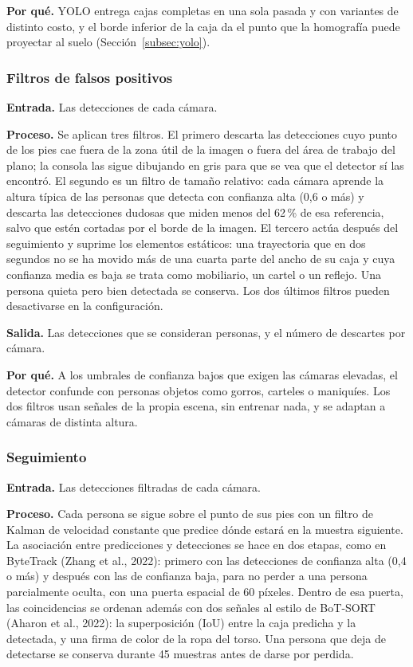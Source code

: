 \textbf{Por qué.} YOLO entrega cajas completas en una sola pasada y con variantes de distinto
costo, y el borde inferior de la caja da el punto que la homografía puede proyectar al suelo
(Sección~\ref{subsec:yolo}).

\subsubsection{Filtros de falsos positivos}
\label{subsec:met-filtros}

\textbf{Entrada.} Las detecciones de cada cámara.

\textbf{Proceso.} Se aplican tres filtros. El primero descarta las detecciones cuyo punto de los
pies cae fuera de la zona útil de la imagen o fuera del área de trabajo del plano; la consola las
sigue dibujando en gris para que se vea que el detector sí las encontró. El segundo es un filtro
de tamaño relativo: cada cámara aprende la altura típica de las personas que detecta con
confianza alta (0,6 o más) y descarta las detecciones dudosas que miden menos del 62\,\% de esa
referencia, salvo que estén cortadas por el borde de la imagen. El tercero actúa después del
seguimiento y suprime los elementos estáticos: una trayectoria que en dos segundos no se ha
movido más de una cuarta parte del ancho de su caja y cuya confianza media es baja se trata
como mobiliario, un cartel o un reflejo. Una persona quieta pero bien detectada se conserva.
Los dos últimos filtros pueden desactivarse en la configuración.

\textbf{Salida.} Las detecciones que se consideran personas, y el número de descartes por
cámara.

\textbf{Por qué.} A los umbrales de confianza bajos que exigen las cámaras elevadas, el detector
confunde con personas objetos como gorros, carteles o maniquíes. Los dos filtros usan señales
de la propia escena, sin entrenar nada, y se adaptan a cámaras de distinta altura.

\subsubsection{Seguimiento}
\label{subsec:met-seguimiento}

\textbf{Entrada.} Las detecciones filtradas de cada cámara.

\textbf{Proceso.} Cada persona se sigue sobre el punto de sus pies con un filtro de Kalman de
velocidad constante que predice dónde estará en la muestra siguiente. La asociación entre
predicciones y detecciones se hace en dos etapas, como en ByteTrack (Zhang et al., 2022):
primero con las detecciones de confianza alta (0,4 o más) y después con las de confianza baja,
para no perder a una persona parcialmente oculta, con una puerta espacial de 60 píxeles. Dentro
de esa puerta, las coincidencias se ordenan además con dos señales al estilo de BoT-SORT
(Aharon et al., 2022): la superposición (IoU) entre la caja predicha y la detectada, y una firma
de color de la ropa del torso. Una persona que deja de detectarse se conserva durante 45
muestras antes de darse por perdida.

